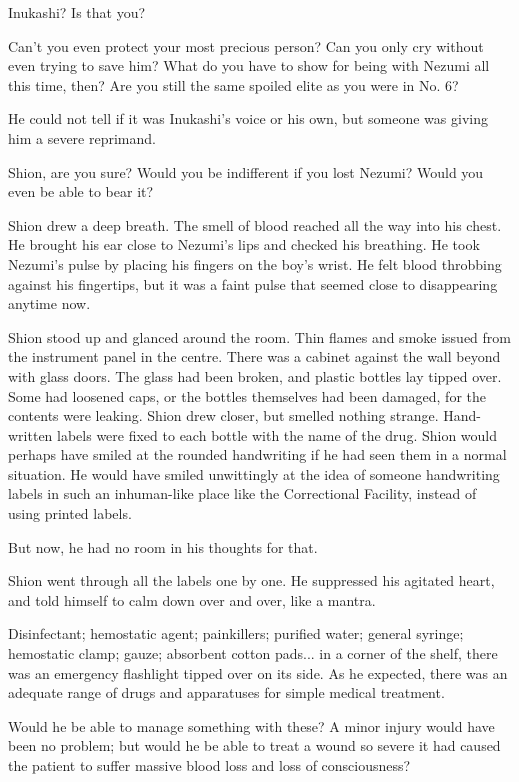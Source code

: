 Inukashi? Is that you?

Can't you even protect your most precious person? Can you only cry
without even trying to save him? What do you have to show for being with
Nezumi all this time, then? Are you still the same spoiled elite as you
were in No. 6?

He could not tell if it was Inukashi's voice or his own, but someone was
giving him a severe reprimand.

Shion, are you sure? Would you be indifferent if you lost Nezumi? Would
you even be able to bear it?

Shion drew a deep breath. The smell of blood reached all the way into
his chest. He brought his ear close to Nezumi's lips and checked his
breathing. He took Nezumi's pulse by placing his fingers on the boy's
wrist. He felt blood throbbing against his fingertips, but it was a
faint pulse that seemed close to disappearing anytime now.

Shion stood up and glanced around the room. Thin flames and smoke issued
from the instrument panel in the centre. There was a cabinet against the
wall beyond with glass doors. The glass had been broken, and plastic
bottles lay tipped over. Some had loosened caps, or the bottles
themselves had been damaged, for the contents were leaking. Shion drew
closer, but smelled nothing strange. Hand-written labels were fixed to
each bottle with the name of the drug. Shion would perhaps have smiled
at the rounded handwriting if he had seen them in a normal situation. He
would have smiled unwittingly at the idea of someone handwriting labels
in such an inhuman-like place like the Correctional Facility, instead of
using printed labels.

But now, he had no room in his thoughts for that.

Shion went through all the labels one by one. He suppressed his agitated
heart, and told himself to calm down over and over, like a mantra.

Disinfectant; hemostatic agent; painkillers; purified water; general
syringe; hemostatic clamp; gauze; absorbent cotton pads... in a corner
of the shelf, there was an emergency flashlight tipped over on its side.
As he expected, there was an adequate range of drugs and apparatuses for
simple medical treatment.

Would he be able to manage something with these? A minor injury would
have been no problem; but would he be able to treat a wound so severe it
had caused the patient to suffer massive blood loss and loss of
consciousness?

